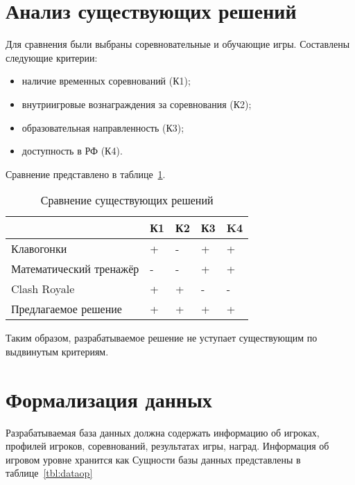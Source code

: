 \section{Анализ существующих решений}

Для сравнения были выбраны соревновательные и обучающие игры. Составлены следующие критерии:
\begin{itemize}
	\item наличие временных соревнований (К1);
	\item внутриигровые вознаграждения за соревнования (К2);
	\item образовательная направленность (К3);
	\item доступность в РФ (К4).
\end{itemize}

Сравнение представлено в таблице~\ref{tbl:comparison}. 

\begin{table}[h!]
	\caption{\label{tbl:comparison}Сравнение существующих решений}
	\begin{tabular}{|l|l|l|l|l|}
		\hline
		& К1 & К2 & К3 & K4\\\hline
		Клавогонки & + & - & + & + \\\hline
		Математический тренажёр & - & - & + & +\\\hline
		Clash Royale  & + & + & - & -\\\hline
		Предлагаемое решение & + & + & + & + \\\hline
	\end{tabular}
\end{table}
\FloatBarrier

Таким образом, разрабатываемое решение не уступает существующим по выдвинутым критериям.

\section{Формализация данных}
Разрабатываемая база данных должна содержать информацию об игроках, профилей игроков, соревнований, результатах игры, наград. Информация об игровом уровне хранится как Сущности базы данных представлены в таблице~\ref{tbl:dataop}

